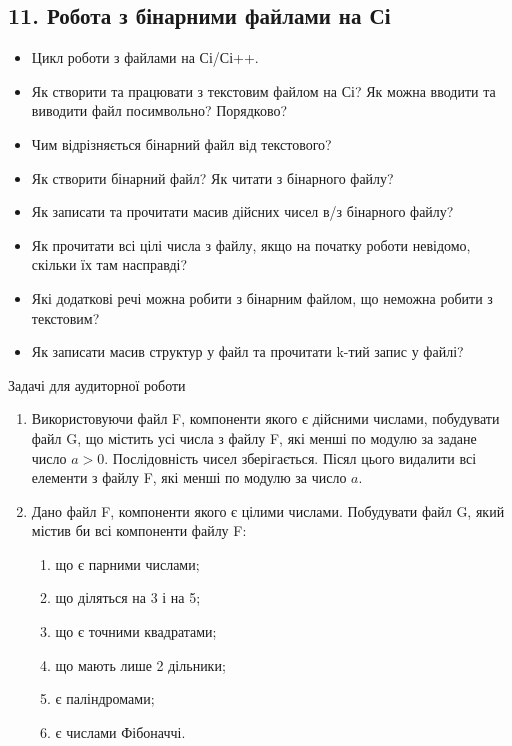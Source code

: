 \documentclass[]{article}
\makeatletter
\newcommand{\xslalph}[1]{\expandafter\@xslalph\csname c@#1\endcsname}
\newcommand{\@xslalph}[1]{%
    \ifcase#1\or а\or б\or в\or г\or д\or e\or є\or ж\or з\or i%
    \or й\or к\or л\or м\or н\or о\or п\or р\or с\or т%
    \or у\or ф\or х\or ц\or ч\or ш\or ю\or я\or аа\or бб\or вв%
    \else\@ctrerr\fi%
}
\makeatother
\begin{document}
\begin{enumerate}
\begin{enumerate}[label=\xslalph*)]
\begin{enumerate}
\begin{enumerate}[label=\xslalph*)]
\newpage
\subsection{11. Робота з бінарними файлами на Сі}
\setcounter{subsection}{1}

\begin{itemize}
\item
  Цикл роботи з файлами на Сі/Сі++.
\item
  Як створити та працювати з текстовим файлом на Сі? Як можна вводити та
  виводити файл посимвольно? Порядково?
\item
  Чим відрізняється бінарний файл від текстового? 
\item 
  Як створити бінарний файл? Як читати з бінарного файлу?
\item
  Як записати та прочитати масив дійсних чисел в/з бінарного файлу?
\item
  Як прочитати всі цілі числа з файлу, якщо на початку роботи невідомо,
  скільки їх там насправді?
\item
  Які додаткові речі можна робити з бінарним файлом, що неможна робити з
  текстовим?
\item
  Як записати масив структур у файл та прочитати k-тий запис у файлі?
\end{itemize}

Задачі для аудиторної роботи

\begin{enumerate}
\def\labelenumi{\arabic{enumi})}

\item
  Використовуючи файл F, компоненти якого є дійсними числами, побудувати
  файл G, що містить усі числа з файлу F, які менші по модулю за задане число $a>0$.
  Послідовність чисел зберігається. Пісял цього видалити всі елементи з файлу F, 
  які менші по модулю за число $a$.

\item
  Дано файл F, компоненти якого є цілими числами. Побудувати файл G,
  який містив би всі компоненти файлу F:
\begin{enumerate}[label=\xslalph*)]
\item
що є парними числами; 
\item
 що діляться на 3 і на 5;
\item
що є точними квадратами; 
\item
що мають лише 2 дільники; 
\item
є паліндромами;
\item
є числами Фібоначчі.
\end{enumerate}



\end{enumerate}
\end{enumerate}
\end{enumerate}
\end{enumerate}
\end{enumerate}
\end{document}
